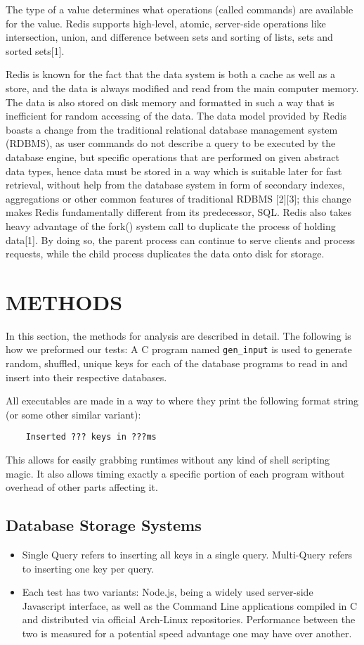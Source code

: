 \documentclass[letterpaper, 10 pt, conference]{ieeeconf}
\begin{document}
The type of a value determines what operations (called commands) are available for the value. Redis supports high-level, atomic, server-side operations like intersection, union, and difference between sets and sorting of lists, sets and sorted sets[1].

Redis is known for the fact that the data system is both a cache as well as a store, and the data is always modified and read from the main computer memory. The data is also stored on disk memory and formatted in such a way that is inefficient for random accessing of the data. The data model provided by Redis boasts a change from the traditional relational database management system (RDBMS), as user commands do not describe a query to be executed by the database engine, but specific operations that are performed on given abstract data types, hence data must be stored in a way which is suitable later for fast retrieval, without help from the database system in form of secondary indexes, aggregations or other common features of traditional RDBMS [2][3]; this change makes Redis fundamentally different from its predecessor, SQL. Redis also takes heavy advantage of the fork() system call to duplicate the process of holding data[1]. By doing so, the parent process can continue to serve clients and process requests, while the child process duplicates the data onto disk for storage. 


\section{METHODS}

In this section, the methods for analysis are described in detail. The following is how we preformed our tests: A C program named \texttt{gen\_input} is used to generate random, shuffled, unique keys for each of the database programs to read in and insert into their respective databases.

All executables are made in a way to where they print the following format string (or some other similar variant):
\begin{verbatim}
    Inserted ??? keys in ???ms
\end{verbatim}
This allows for easily grabbing runtimes without any kind of shell scripting magic. It also allows timing exactly a specific portion of each program without overhead of other parts affecting it.
\subsection{Database Storage Systems}
 \begin{itemize}
\item Single Query refers to inserting all keys in a single query. Multi-Query refers to inserting one key per query.
\item Each test has two variants: Node.js, being a widely used server-side Javascript interface, as well as the Command Line applications compiled in C and distributed via official Arch-Linux repositories. Performance between the two is measured for a potential speed advantage one may have over another.
\end{itemize}
\end{document}

